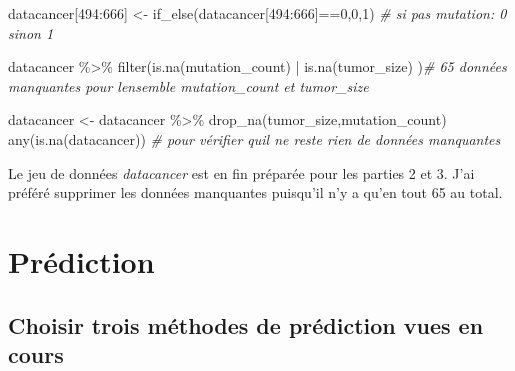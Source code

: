 \documentclass[
  12pt,
]{article}
\newenvironment{Shaded}{\begin{snugshade}}{\end{snugshade}}
\newcommand{\CommentTok}[1]{\textcolor[rgb]{0.56,0.35,0.01}{\textit{#1}}}
\newcommand{\DecValTok}[1]{\textcolor[rgb]{0.00,0.00,0.81}{#1}}
\newcommand{\FunctionTok}[1]{\textcolor[rgb]{0.00,0.00,0.00}{#1}}
\newcommand{\NormalTok}[1]{#1}
\newcommand{\OtherTok}[1]{\textcolor[rgb]{0.56,0.35,0.01}{#1}}
\newcommand{\SpecialCharTok}[1]{\textcolor[rgb]{0.00,0.00,0.00}{#1}}
\begin{document}
\begin{Shaded}
\begin{Highlighting}[]
\NormalTok{datacancer[}\DecValTok{494}\SpecialCharTok{:}\DecValTok{666}\NormalTok{] }\OtherTok{\textless{}{-}} \FunctionTok{if\_else}\NormalTok{(datacancer[}\DecValTok{494}\SpecialCharTok{:}\DecValTok{666}\NormalTok{]}\SpecialCharTok{==}\DecValTok{0}\NormalTok{,}\DecValTok{0}\NormalTok{,}\DecValTok{1}\NormalTok{) }\CommentTok{\# si pas mutation: 0 sinon 1 }

\NormalTok{datacancer }\SpecialCharTok{\%\textgreater{}\%} 
  \FunctionTok{filter}\NormalTok{(}\FunctionTok{is.na}\NormalTok{(mutation\_count) }\SpecialCharTok{|} \FunctionTok{is.na}\NormalTok{(tumor\_size)}
\NormalTok{         )}\CommentTok{\# 65 données manquantes pour l\textquotesingle{}ensemble mutation\_count et tumor\_size}
 
\NormalTok{datacancer }\OtherTok{\textless{}{-}}\NormalTok{ datacancer }\SpecialCharTok{\%\textgreater{}\%} 
  \FunctionTok{drop\_na}\NormalTok{(tumor\_size,mutation\_count)}
\FunctionTok{any}\NormalTok{(}\FunctionTok{is.na}\NormalTok{(datacancer)) }\CommentTok{\# pour vérifier qu\textquotesingle{}il ne reste rien de données manquantes}
\end{Highlighting}
\end{Shaded}

Le jeu de données \emph{datacancer} est en fin préparée pour les parties
2 et 3. J'ai préféré supprimer les données manquantes puisqu'il n'y a
qu'en tout 65 au total.

\hypertarget{pruxe9diction}{%
\section{Prédiction}\label{pruxe9diction}}

\hypertarget{choisir-trois-muxe9thodes-de-pruxe9diction-vues-en-cours}{%
\subsection{Choisir trois méthodes de prédiction vues en
cours}\label{choisir-trois-muxe9thodes-de-pruxe9diction-vues-en-cours}}
\end{document}
